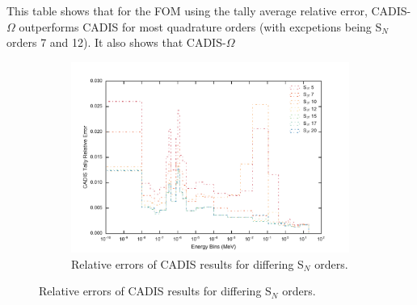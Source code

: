 This table shows that for the FOM using the tally average relative error,
CADIS-$\Omega$ outperforms CADIS for most quadrature orders (with excpetions
being S$_N$ orders 7 and 12). It also shows that CADIS-$\Omega$

\begin{figure}[htb!]
  \centering
  \begin{subfigure}[t]{\textwidth}
    \centering
    \includegraphics[width=\linewidth]{./chapters/characterization_probs/figures/angle/prob_1/err_quad_cadis.pdf}
    \caption{Relative errors of CADIS results for differing S$_N$ orders.}
    \label{fig:sn_cad_err}
  \end{subfigure}
\end{figure}

